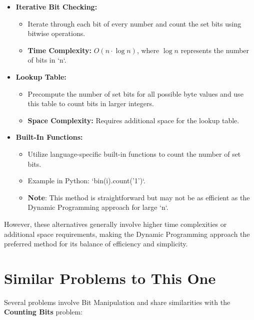 \begin{itemize}
    \item \textbf{Iterative Bit Checking:}
    \begin{itemize}
        \item Iterate through each bit of every number and count the set bits using bitwise operations.
        \item \textbf{Time Complexity:} \(O(n \cdot \log n)\), where \(\log n\) represents the number of bits in `n`.
    \end{itemize}
    
    \item \textbf{Lookup Table:}
    \begin{itemize}
        \item Precompute the number of set bits for all possible byte values and use this table to count bits in larger integers.
        \item \textbf{Space Complexity:} Requires additional space for the lookup table.
    \end{itemize}
    
    \item \textbf{Built-In Functions:}
    \begin{itemize}
        \item Utilize language-specific built-in functions to count the number of set bits.
        \item Example in Python: `bin(i).count('1')`.
        \item \textbf{Note}: This method is straightforward but may not be as efficient as the Dynamic Programming approach for large `n`.
    \end{itemize}
\end{itemize}

However, these alternatives generally involve higher time complexities or additional space requirements, making the Dynamic Programming approach the preferred method for its balance of efficiency and simplicity.

\section*{Similar Problems to This One}

Several problems involve Bit Manipulation and share similarities with the \textbf{Counting Bits} problem:

